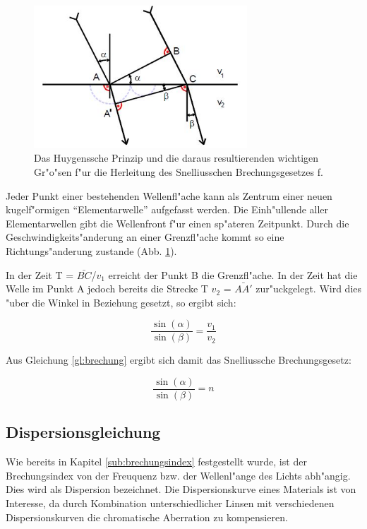	\begin{figure}[!h]
		\centering
		\includegraphics[width = 8cm]{img/huygen.jpg}
		\caption{Das Huygenssche Prinzip und die daraus resultierenden wichtigen Gr"o"sen f"ur die Herleitung des Snelliusschen Brechungsgesetzes f.}
		\label{huygen}
	\end{figure}

	Jeder Punkt einer bestehenden Wellenfl"ache kann als Zentrum einer neuen kugelf"ormigen "`Elementarwelle"' aufgefasst werden. Die Einh"ullende aller Elementarwellen gibt die Wellenfront f"ur einen sp"ateren Zeitpunkt. Durch die Geschwindigkeits"anderung an einer Grenzfl"ache kommt so eine Richtungs"anderung zustande (Abb. \ref{huygen}).

	In der Zeit T = $\bar{BC}$/$v_\mathrm{1}$ erreicht der Punkt B die Grenzfl"ache. In der Zeit hat die Welle im Punkt A jedoch bereits die Strecke T $v_\mathrm{2}$ =  $\bar{AA'}$ zur"uckgelegt. Wird dies "uber die Winkel in Beziehung gesetzt, so ergibt sich:

	\begin{equation}
		\frac{\sin(\alpha)}{\sin(\beta)} = \frac{v_\mathrm{1}}{v_\mathrm{2}}  \label{gl:huygen}
	\end{equation}

	Aus Gleichung \eqref{gl:brechung} ergibt sich damit das Snelliussche Brechungsgesetz:

	\begin{equation}
		\frac{\sin(\alpha)}{\sin(\beta)} = n 
	\end{equation}

	\subsection{Dispersionsgleichung} %
	\label{sub:dispersionsgleichung}
	
	Wie bereits in Kapitel \ref{sub:brechungsindex} festgestellt wurde, ist der Brechungsindex von der Freuquenz bzw. der Wellenl"ange des Lichts abh"angig. Dies wird als Dispersion bezeichnet. Die Dispersionskurve eines Materials ist von Interesse, da durch Kombination unterschiedlicher Linsen mit verschiedenen Dispersionskurven die chromatische Aberration zu kompensieren.

